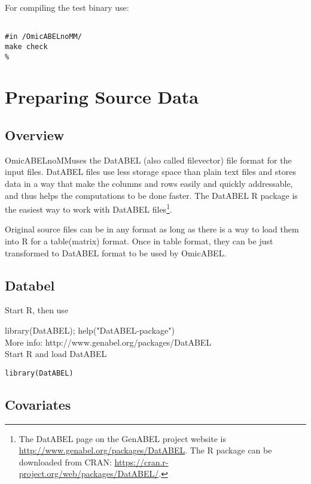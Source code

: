 \documentclass{report}
\newcommand{\oanomm}{OmicABELnoMM}
\begin{document}
For compiling the test binary use:
\begin{lstlisting}[escapechar=\%]

#in /OmicABELnoMM/
make check
%
\end{lstlisting}

\chapter{Preparing Source Data}

\section{Overview}

\oanomm uses the DatABEL (also called filevector) file format for the
input files. DatABEL files use less storage space than plain text
files and stores data in a way that make the columns and rows easily
and quickly addressable, and thus helps the computations to be done
faster. The DatABEL R package is the easiest way to work with DatABEL files\footnote{The DatABEL page on the GenABEL project website is
  \url{http://www.genabel.org/packages/DatABEL}. The R package can be
  downloaded from CRAN:
  \url{https://cran.r-project.org/web/packages/DatABEL/}.}.


Original source files can be in any format as long as there is a way
to load them into R for a table(matrix) format. Once in table format,
they can be just transformed to DatABEL format to be used by OmicABEL.


\section{Databel}
Start R, then use

library(DatABEL); help("DatABEL-package")\\
More info: http://www.genabel.org/packages/DatABEL\\
Start R and load DatABEL

\begin{lstlisting}[escapechar=\%]
library(DatABEL)
\end{lstlisting}

\section{Covariates}
\end{document}
